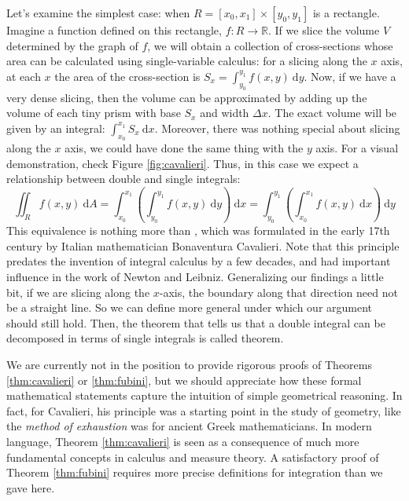 Let's examine the simplest case: when $R = [x_0, x_1] \times [y_0, y_1]$ is a rectangle. Imagine a function defined on this rectangle, $f: R\rightarrow \mathbb{R}$. If we slice the volume $V$ determined by the graph of $f$, we will obtain a collection of cross-sections whose area can be calculated using single-variable calculus: for a slicing along the $x$ axis, at each $x$ the area of the cross-section is $S_x = \int_{y_0}^{y_1} f(x, y) \ \mathrm{d} y$. Now, if we have a very dense slicing, then the volume can be approximated by adding up the volume of each tiny prism with base $S_x$ and width $\Delta x$. The exact volume will be given by an integral: $\int_{x_0}^{x_1} S_x \ \mathrm{d} x$. Moreover, there was nothing special about slicing along the $x$ axis, we could have done the same thing with the $y$ axis. For a visual demonstration, check Figure \ref{fig:cavalieri}. Thus, in this case we expect a relationship between double and single integrals:
\begin{equation}
    \iint_R f(x,y) \ \mathrm{d} A = \int_{x_0}^{x_1} \left( \int_{y_0}^{y_1} f(x,y) \ \mathrm{d} y\right) \ \mathrm{d} x = \int_{y_0}^{y_1} \left( \int_{x_0}^{x_1} f(x,y) \ \mathrm{d} x\right) \ \mathrm{d} y
\end{equation}
This equivalence is nothing more than , which was formulated in the early 17th century by Italian mathematician Bonaventura Cavalieri. Note that this principle predates the invention of integral calculus by a few decades, and had important influence in the work of Newton and Leibniz. Generalizing our findings a little bit, if we are slicing along the $x$-axis, the boundary along that direction need not be a straight line. So we can define more general  under which our argument should still hold. Then, the theorem that tells us that a double integral can be decomposed in terms of single integrals is called  theorem. 

We are currently not in the position to provide rigorous proofs of Theorems \ref{thm:cavalieri} or \ref{thm:fubini}, but we should appreciate how these formal mathematical statements capture the intuition of simple geometrical reasoning. In fact, for Cavalieri, his principle was a starting point in the study of geometry, like the \textit{method of exhaustion} was for ancient Greek mathematicians. In modern language, Theorem \ref{thm:cavalieri} is seen as a consequence of much more fundamental concepts in calculus and measure theory. A satisfactory proof of Theorem \ref{thm:fubini} requires more precise definitions for integration than we gave here.

